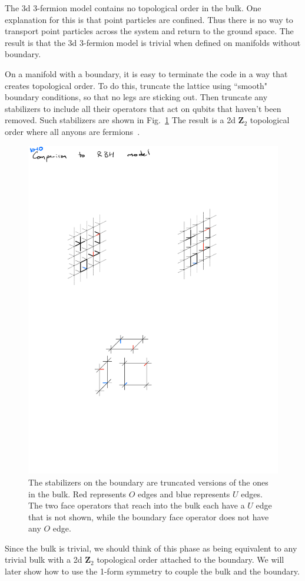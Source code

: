 \documentclass[twocolumn, longbibliography]{revtex4-2}
\begin{document}
The 3d 3-fermion model contains no topological order in the bulk. One explanation for this is that point particles are confined. Thus there is no way to transport point particles across the system and return to the ground space. The result is that the 3d 3-fermion model is trivial when defined on manifolds without boundary.
	
On a manifold with a boundary, it is easy to terminate the code in a way that creates topological order. To do this, truncate the lattice using ``smooth" boundary conditions, so that no legs are sticking out. Then truncate any stabilizers to include all their operators that act on qubits that haven't been removed. Such stabilizers are shown in Fig.~\ref{fig:bdyops} The result is a 2d $\mathbf{Z}_2$ topological order where all anyons are fermions~\cite{BurnellSoluble}.
	
\begin{figure}
\centering
\includegraphics[width=.6\linewidth]{bdyops}
\caption{The stabilizers on the boundary are truncated versions of the ones in the bulk. Red represents $O$ edges and blue represents $U$ edges. The two face operators that reach into the bulk each have a $U$ edge that is not shown, while the boundary face operator does not have any $O$ edge.}
\label{fig:bdyops}
\end{figure}
	
Since the bulk is trivial, we should think of this phase as being equivalent to any trivial bulk with a 2d $\mathbf{Z}_2$ topological order attached to the boundary. We will later show how to use the 1-form symmetry to couple the bulk and the boundary.
	
\end{document}
